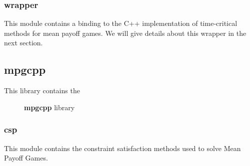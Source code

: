 \subsubsection{wrapper}
This module contains a binding to the C++ implementation of time-critical methods for mean payoff games.
\newline We will give details about this wrapper in the next section.
\subsection{mpgcpp}
This library contains the 
\begin{figure}[H]
	\centering
	\caption{\textbf{mpgcpp} library}
\end{figure}
\subsubsection{csp}
This module contains the constraint satisfaction methods used to solve Mean Payoff Games. 
